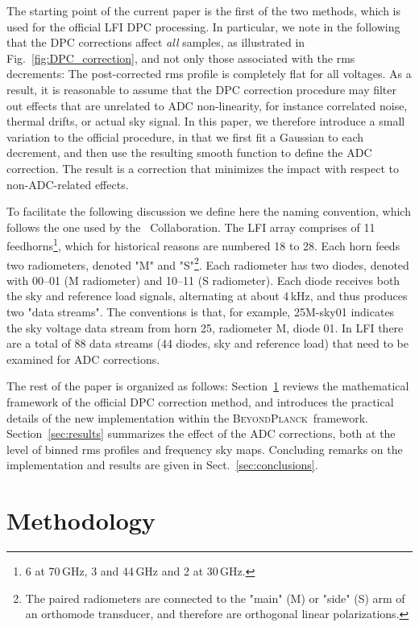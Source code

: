 \documentclass[twocolumn]{aa}
\newcommand{\BP}{\textsc{BeyondPlanck}}
\begin{document}
The starting point of the current paper is the first of the two methods, which is used for the official LFI DPC processing. In particular, we note in the following that the DPC corrections affect \emph{all} samples, as illustrated in Fig.~\ref{fig:DPC_correction}, and not only those associated with the rms decrements: The post-corrected rms profile is completely flat for all voltages. As a result, it is reasonable to assume that the DPC correction procedure may filter out effects that are unrelated to ADC non-linearity, for instance correlated noise, thermal drifts, or actual sky signal. In this paper, we therefore introduce a small variation to the official procedure, in that we first fit a Gaussian to each decrement, and then use the resulting smooth function to define the ADC correction. The result is a correction that minimizes the impact with respect to non-ADC-related effects. 

To facilitate the following discussion we define here the naming convention, which follows the one used by the \Planck\ Collaboration. The LFI array comprises of 11 feedhorns\footnote{6 at 70\,GHz, 3 and 44\,GHz and 2 at 30\,GHz.}, which for historical reasons are numbered 18 to 28. Each horn feeds two radiometers, denoted "M" and "S"\footnote{The paired radiometers are connected to the "main" (M) or "side" (S) arm of an orthomode transducer, and therefore are orthogonal linear polarizations.}. Each radiometer has two diodes, denoted with 00--01 (M radiometer) and 10--11 (S radiometer). Each diode receives both the sky and reference load signals, alternating at about 4\,kHz, and thus produces two "data streams". The conventions is that, for example, 25M-sky01 indicates the sky voltage data stream from horn 25, radiometer M, diode 01. In LFI there are a total of 88 data streams (44 diodes, sky and reference load) that need to be examined for ADC corrections.

The rest of the paper is organized as follows: Section~\ref{sec:framework} reviews the mathematical framework of the official DPC correction method, and introduces the practical details of the new implementation within the \BP\ framework. Section~\ref{sec:results} summarizes the effect of the ADC corrections, both at the level of binned rms profiles and frequency sky maps. Concluding remarks on the implementation and results are given in Sect.~\ref{sec:conclusions}.

\section{Methodology}\label{sec:framework}
\end{document}
